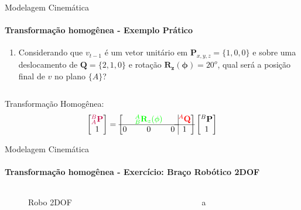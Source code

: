 \documentclass{beamer}
\begin{document}
\begin{frame}{Modelagem Cinemática}
    \framesubtitle{Transformação homogênea - Exemplo Prático}
    \begin{enumerate}
        \item Considerando que $v_{t-1}$ é um vetor unitário em $\mathbf{P}_{x,y,z}=\{1,0,0\}$ e sobre uma deslocamento de $\mathbf{Q}=\{2,1,0\}$ e rotação $\mathbf{R_z(\phi)}=20^o$, qual será a posição final de $v$ no plano $\{A\}$?
    \end{enumerate}
    \begin{columns}
        \begin{column}[c]{0.5\textwidth}
            
        \end{column}
        \begin{column}[c]{0.5\textwidth}
            
        \end{column}
    \end{columns}
    Transformação Homogênea:
    \begin{equation*}
        \begin{bmatrix}
            \color{purple}{{}^B_A\mathbf{P}} \\ 1
        \end{bmatrix}
        =
        \left[
            \begin{matrix}
                  & \color{green}{{}_B^A\mathbf{R}_z(\phi)} &   \\ \hline
                0 & 0                                       & 0 \\
            \end{matrix} \right.
            \left.
            \vline
            \begin{matrix}
                \color{red}{{}^A\mathbf{Q}} \\ \hline
                1
            \end{matrix} \right]
        \begin{bmatrix}
            {}^B\mathbf{P} \\
            1
        \end{bmatrix}
    \end{equation*}
\end{frame}




\begin{frame}{Modelagem Cinemática}
    \framesubtitle{Transformação homogênea - Exercício: Braço Robótico 2DOF}

    \begin{columns}
        \begin{column}[c]{0.5\textwidth}
            \begin{figure}[!ht]
                
                \caption{Robo 2DOF}
            \end{figure}
        \end{column}
        \begin{column}[c]{0.5\textwidth}
            a
        \end{column}
    \end{columns}
\end{frame}
\end{document}
